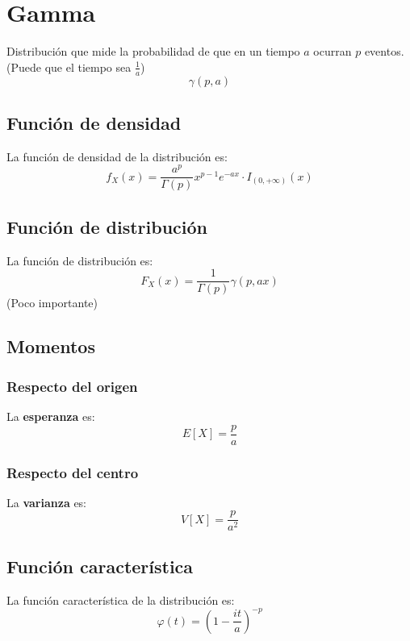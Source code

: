 \section{Gamma}
\label{sec:gamma}
Distribución que mide la probabilidad de que en un tiempo $a$ ocurran $p$ eventos. (Puede que el tiempo sea $\frac{1}{a}$)
\[
\boxed{\gamma\left( p, a \right)}
\]

\subsection{Función de densidad}
La función de densidad de la distribución es:
\[
f_X \left( x \right) = \frac{a^p}{\Gamma\left( p \right)} x^{p - 1} e^{-ax} \cdot I_{\left( 0, +\infty \right)} \left( x \right)
\]

\subsection{Función de distribución}
La función de distribución es:
\[
F_X\left( x \right) = \frac{1}{\Gamma\left( p \right)} \gamma\left( p, ax \right)
\]
(Poco importante)

\subsection{Momentos}

\subsubsection*{Respecto del origen}
La \textbf{esperanza} es: 
\[
    E\left[ X \right] = \frac{p}{a}
\]
\subsubsection*{Respecto del centro}
La \textbf{varianza} es:
\[
    V\left[ X \right] = \frac{p}{a^2}
\]

\subsection{Función característica}
La función característica de la distribución es:
\[
\varphi\left( t \right) = \left( 1 - \frac{it}{a} \right)^{-p}
\]

